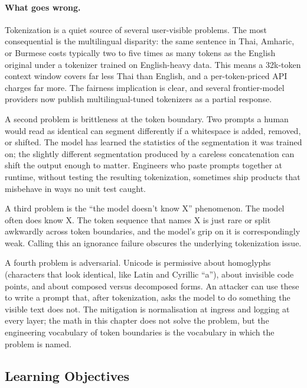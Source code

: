 \paragraph{What goes wrong.} Tokenization is a quiet source of
several user-visible problems. The most consequential is the
multilingual disparity: the same sentence in Thai, Amharic, or
Burmese costs typically two to five times as many tokens as the
English original under a tokenizer trained on English-heavy data.
This means a 32k-token context window covers far less Thai than
English, and a per-token-priced API charges far more. The fairness
implication is clear, and several frontier-model providers now
publish multilingual-tuned tokenizers as a partial response.

A second problem is brittleness at the token boundary. Two prompts
a human would read as identical can segment differently if a
whitespace is added, removed, or shifted. The model has learned
the statistics of the segmentation it was trained on; the
slightly different segmentation produced by a careless
concatenation can shift the output enough to matter. Engineers
who paste prompts together at runtime, without testing the
resulting tokenization, sometimes ship products that misbehave in
ways no unit test caught.

A third problem is the ``the model doesn't know X'' phenomenon.
The model often does know X. The token sequence that names X is
just rare or split awkwardly across token boundaries, and the
model's grip on it is correspondingly weak. Calling this an
ignorance failure obscures the underlying tokenization issue.

A fourth problem is adversarial. Unicode is permissive about
homoglyphs (characters that look identical, like Latin and
Cyrillic ``a''), about invisible code points, and about composed
versus decomposed forms. An attacker can use these to write a
prompt that, after tokenization, asks the model to do something
the visible text does not. The mitigation is normalisation at
ingress and logging at every layer; the math in this chapter does
not solve the problem, but the engineering vocabulary of token
boundaries is the vocabulary in which the problem is named.

\subsection{Learning Objectives}

